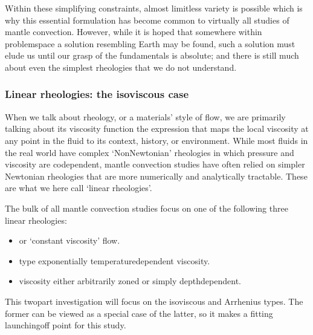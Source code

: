 \documentclass[letterpaper,10pt,english]{jupyterBook}
\begin{document}
\sphinxAtStartPar
Within these simplifying constraints, almost limitless variety is possible \sphinxhyphen{} which is why this essential formulation has become common to virtually all studies of mantle convection. However, while it is hoped that somewhere within problem\sphinxhyphen{}space a solution resembling Earth may be found, such a solution must elude us until our grasp of the fundamentals is absolute; and there is still much about even the simplest rheologies that we do not understand.


\subsubsection{Linear rheologies: the isoviscous case}
\label{\detokenize{content/chapter_04_isoviscous/background/basics:linear-rheologies-the-isoviscous-case}}
\sphinxAtStartPar
When we talk about rheology, or a materials’ style of flow, we are primarily talking about its viscosity function \sphinxhyphen{} the expression that maps the local viscosity at any point in the fluid to its context, history, or environment. While most fluids in the real world have complex ‘Non\sphinxhyphen{}Newtonian’ rheologies in which pressure and viscosity are co\sphinxhyphen{}dependent, mantle convection studies have often relied on simpler Newtonian rheologies that are more numerically and analytically tractable. These are what we here call ‘linear rheologies’.

\sphinxAtStartPar
The bulk of all mantle convection studies focus on one of the following three linear rheologies:
\begin{itemize}
\item {} 
\sphinxAtStartPar
{} or ‘constant viscosity’ flow.

\item {} 
\sphinxAtStartPar
{}\sphinxhyphen{}type exponentially temperature\sphinxhyphen{}dependent viscosity.

\item {} 
\sphinxAtStartPar
{} viscosity \sphinxhyphen{} either arbitrarily zoned or simply depth\sphinxhyphen{}dependent.

\end{itemize}

\sphinxAtStartPar
This two\sphinxhyphen{}part investigation will focus on the isoviscous and Arrhenius types. The former can be viewed as a special case of the latter, so it makes a fitting launching\sphinxhyphen{}off point for this study.
\end{document}
